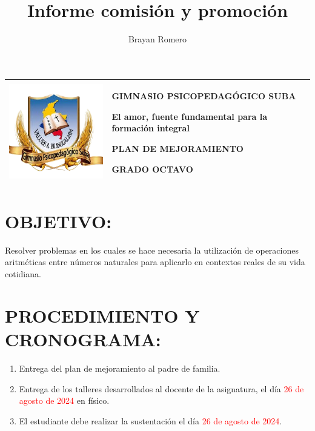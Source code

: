 \documentclass[spanish,12pt,a4paper]{article}
\title{Informe comisión y promoción}
\author{Brayan Romero}
\begin{document}
	
	\begin{center}
		\begin{tabular}{|p{3cm}|p{12cm}|}
			\hline
			\vspace{0.05cm}
			\centering
			\includegraphics[scale=0.35]{logo.png}
			&
			\begin{center}
				\textbf{GIMNASIO PSICOPEDAGÓGICO SUBA}
				
				\vspace{0.1cm}
				El amor, fuente fundamental para la formación integral
				
				\vspace{0.1cm}
				\textbf{PLAN DE MEJORAMIENTO}
				
				\vspace{0.1cm}
				\textbf{GRADO OCTAVO}
				
			\end{center}
			\\
			\hline
			
			
		\end{tabular}
		
	\end{center}	
	
	\section*{OBJETIVO:}
	Resolver problemas en los cuales se hace necesaria la utilización de operaciones aritméticas entre números naturales para aplicarlo en contextos reales de su vida cotidiana. 
	
	\section*{PROCEDIMIENTO Y CRONOGRAMA:}
	\begin{enumerate}
		\item Entrega del plan de mejoramiento al padre de familia.
		\item Entrega de los talleres desarrollados al docente de la asignatura, el día \textcolor{red}{26 de agosto de 2024} en físico.
		\item El estudiante debe realizar la sustentación el día \textcolor{red}{26 de agosto de 2024}.
	\end{enumerate}
	
\end{document}
